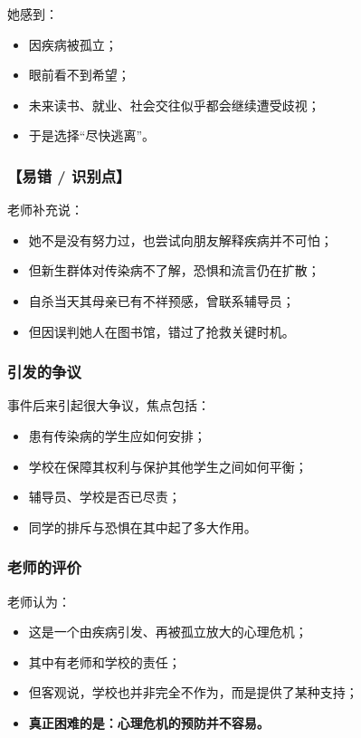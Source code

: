 \documentclass[
  chinese,
  9pt,
  a4paper,
]{ctexart}
\providecommand{\tightlist}{%
  \setlength{\itemsep}{0pt}\setlength{\parskip}{0pt}}
\begin{document}
她感到：

\begin{itemize}
\tightlist
\item
  因疾病被孤立；
\item
  眼前看不到希望；
\item
  未来读书、就业、社会交往似乎都会继续遭受歧视；
\item
  于是选择``尽快逃离''。
\end{itemize}

\subsubsection{【易错 / 识别点】}\label{ux6613ux9519-ux8bc6ux522bux70b9}

老师补充说：

\begin{itemize}
\tightlist
\item
  她不是没有努力过，也尝试向朋友解释疾病并不可怕；
\item
  但新生群体对传染病不了解，恐惧和流言仍在扩散；
\item
  自杀当天其母亲已有不祥预感，曾联系辅导员；
\item
  但因误判她人在图书馆，错过了抢救关键时机。
\end{itemize}

\subsubsection{引发的争议}\label{ux5f15ux53d1ux7684ux4e89ux8bae}

事件后来引起很大争议，焦点包括：

\begin{itemize}
\tightlist
\item
  患有传染病的学生应如何安排；
\item
  学校在保障其权利与保护其他学生之间如何平衡；
\item
  辅导员、学校是否已尽责；
\item
  同学的排斥与恐惧在其中起了多大作用。
\end{itemize}

\subsubsection{老师的评价}\label{ux8001ux5e08ux7684ux8bc4ux4ef7}

老师认为：

\begin{itemize}
\tightlist
\item
  这是一个由疾病引发、再被孤立放大的心理危机；
\item
  其中有老师和学校的责任；
\item
  但客观说，学校也并非完全不作为，而是提供了某种支持；
\item
  \textbf{真正困难的是：心理危机的预防并不容易。}
\end{itemize}
\end{document}
